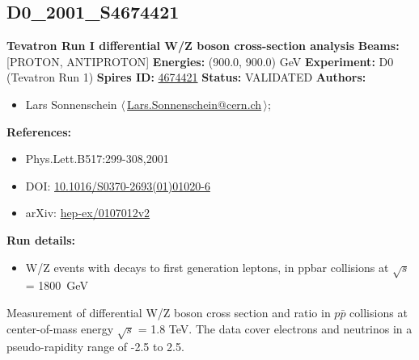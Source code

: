 \subsection[D0\_2001\_S4674421]{D0\_2001\_S4674421\,\cite{Abazov:2001nta}}
\textbf{Tevatron Run I differential W/Z boson cross-section analysis}\newline
\textbf{Beams:} [PROTON, ANTIPROTON] \newline
\textbf{Energies:} (900.0, 900.0) GeV \newline
\textbf{Experiment:} D0 (Tevatron Run 1) \newline
\textbf{Spires ID:} \href{http://www.slac.stanford.edu/spires/find/hep/www?rawcmd=key+4674421}{4674421}\newline
\textbf{Status:} VALIDATED\newline
\textbf{Authors:}
\begin{itemize}
  \item Lars Sonnenschein $\langle\,$\href{mailto:Lars.Sonnenschein@cern.ch}{Lars.Sonnenschein@cern.ch}$\,\rangle$;
\end{itemize}
\textbf{References:}
\begin{itemize}
  \item Phys.Lett.B517:299-308,2001
  \item DOI: \href{http://dx.doi.org/10.1016/S0370-2693(01)01020-6}{10.1016/S0370-2693(01)01020-6}
  \item arXiv: \href{http://arxiv.org/abs/hep-ex/0107012v2}{hep-ex/0107012v2}
\end{itemize}
\textbf{Run details:}
\begin{itemize}

  \item W/Z events with decays to first generation leptons, in ppbar collisions at \ensuremath{\sqrt{s}} = 1800~GeV\end{itemize}

\noindent Measurement of differential W/Z boson cross section and ratio in $p \bar{p}$ collisions at center-of-mass energy \ensuremath{\sqrt{s}} = 1.8 TeV. The data cover electrons and neutrinos in a pseudo-rapidity range of -2.5 to 2.5.

\clearpage


\clearpage

